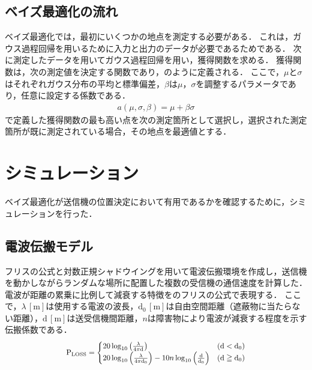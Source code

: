 \documentclass[twocolumn]{ltjarticle}
\begin{document}
\subsection{ベイズ最適化の流れ}

ベイズ最適化では，最初にいくつかの地点を測定する必要がある．
これは，ガウス過程回帰を用いるために入力と出力のデータが必要であるためである．
次に測定したデータを用いてガウス過程回帰を用い，獲得関数を求める．
獲得関数は，次の測定値を決定する関数であり，のように定義される．
ここで，\(\mu\)と\(\sigma\)はそれぞれガウス分布の平均と標準偏差，\(\beta\)は\(\mu\)，\(\sigma\)を調整するパラメータであり，任意に設定する係数である．
\begin{align}
	a(\mu, \sigma, \beta) = \mu + \beta \sigma \label{eq:acquisition}
\end{align}
で定義した獲得関数の最も高い点を次の測定箇所として選択し，選択された測定箇所が既に測定されている場合，その地点を最適値とする．
\section{シミュレーション}

ベイズ最適化が送信機の位置決定において有用であるかを確認するために，シミュレーションを行った．
\subsection{電波伝搬モデル}

フリスの公式と対数正規シャドウイングを用いて電波伝搬環境を作成し，送信機を動かしながらランダムな場所に配置した複数の受信機の通信速度を計算した．
電波が距離の累乗に比例して減衰する特徴をのフリスの公式で表現する．
ここで，\(\lambda\,\mathrm{[m]}\)は使用する電波の波長，\(\mathrm{d_0}\,\mathrm{[m]}\)は自由空間距離（遮蔽物に当たらない距離），\(\mathrm{d}\,\mathrm{[m]}\)は送受信機間距離，\(n\)は障害物により電波が減衰する程度を示す伝搬係数である．
\begin{align}
	\scalebox{0.9}{
		\(
		\mathrm{P_{LOSS}} =
		\begin{cases}
			20 \log_{10} \left( \frac{\lambda}{4 \pi \mathrm{d}} \right)                                                         & (\mathrm{d < d_0})     \\
			20 \log_{10} \left( \frac{\lambda}{4 \pi \mathrm{d_0}} \right) - 10n \log_{10} \left( \mathrm{\frac{d}{d_0}} \right) & (\mathrm{d \geqq d_0})
		\end{cases} \label{eq:friss}
		\)
	}
\end{align}
\end{document}
